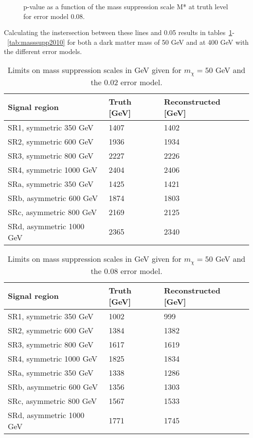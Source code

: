  \begin{figure}[H] %
    \hfill
    \caption{p-value as a function of the mass suppression scale M* at truth level for error model 0.08.}
    \label{fig:SRnewMr}
  \end{figure}

Calculating the instersection between these lines and 0.05 results in tables~\ref{tab:masssupp002}-~\ref{tab:masssupp2010} for both a dark matter mass of 50 GeV and at 400 GeV with the different error models.

\begin{table}[ht]
\begin{center}
\begin{tabular}{|l|l|l|}
\hline
Signal region & Truth [GeV]& Reconstructed [GeV]\\ \hline
SR1, symmetric 350 GeV &1407&1402\\
SR2, symmetric 600 GeV&1936&1934\\
SR3, symmetric 800 GeV&2227&2226\\
SR4, symmetric 1000 GeV&2404&2406\\ \hline
SRa, symmetric 350 GeV &1425&1421\\
SRb, asymmetric 600 GeV &1874&1803\\
SRc, asymmetric 800 GeV&2169&2125\\
SRd, asymmetric 1000 GeV&2365&2340\\ \hline
\end{tabular}
\caption{Limits on mass suppression scales in GeV given for $m_{\chi}=50$ GeV and the 0.02 error model.}
\label{tab:masssupp002}
\end{center}
\end{table}

\begin{table}[ht]
\begin{center}
\begin{tabular}{|l|l|l|}
\hline
Signal region & Truth [GeV]& Reconstructed [GeV]\\ \hline
SR1, symmetric 350 GeV&1002&999\\
SR2, symmetric 600 GeV&1384&1382\\
SR3, symmetric 800 GeV&1617&1619\\
SR4, symmetric 1000 GeV&1825&1834\\ \hline
SRa, symmetric 350 GeV&1338&1286\\
SRb, asymmetric 600 GeV&1356&1303\\
SRc, asymmetric 800 GeV&1567&1533\\
SRd, asymmetric 1000 GeV&1771&1745\\ \hline
\end{tabular}
\caption{Limits on mass suppression scales in GeV given for $m_{\chi}=50$ GeV and the 0.08 error model.}
\label{tab:masssupp010}
\end{center}
\end{table}

